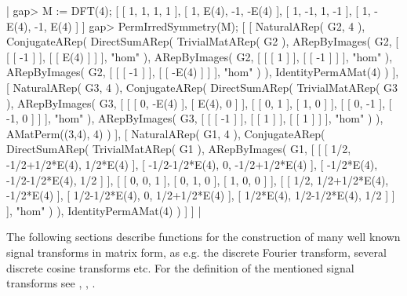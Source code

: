 |    gap> M := DFT(4);
    [ [ 1, 1, 1, 1 ], [ 1, E(4), -1, -E(4) ], [ 1, -1, 1, -1 ], 
      [ 1, -E(4), -1, E(4) ] ]
    gap> PermIrredSymmetry(M);
    [ [ NaturalARep( G2, 4 ), ConjugateARep(
              DirectSumARep(
                TrivialMatARep( G2 ),
                ARepByImages(
                  G2,
                  [ [ [ -1 ] ],
                    [ [ E(4) ] ]
                  ],
                  "hom"
                ),
                ARepByImages(
                  G2,
                  [ [ [ 1 ] ],
                    [ [ -1 ] ]
                  ],
                  "hom"
                ),
                ARepByImages(
                  G2,
                  [ [ [ -1 ] ],
                    [ [ -E(4) ] ]
                  ],
                  "hom"
                )
              ),
              IdentityPermAMat(4)
            ) ], [ NaturalARep( G3, 4 ), ConjugateARep(
              DirectSumARep(
                TrivialMatARep( G3 ),
                ARepByImages(
                  G3,
                  [ [ [ 0, -E(4) ], [ E(4), 0 ] ],
                    [ [ 0, 1 ], [ 1, 0 ] ],
                    [ [ 0, -1 ], [ -1, 0 ] ]
                  ],
                  "hom"
                ),
                ARepByImages(
                  G3,
                  [ [ [ -1 ] ],
                    [ [ 1 ] ],
                    [ [ 1 ] ]
                  ],
                  "hom"
                )
              ),
              AMatPerm((3,4), 4)
            ) ], [ NaturalARep( G1, 4 ), ConjugateARep(
              DirectSumARep(
                TrivialMatARep( G1 ),
                ARepByImages(
                  G1,
                  [ [ [ 1/2, -1/2+1/2*E(4), 1/2*E(4) ], 
              [ -1/2-1/2*E(4), 0, -1/2+1/2*E(4) ], 
              [ -1/2*E(4), -1/2-1/2*E(4), 1/2 ] ],
                    [ [ 0, 0, 1 ], [ 0, 1, 0 ], [ 1, 0, 0 ] ],
                    [ [ 1/2, 1/2+1/2*E(4), -1/2*E(4) ], 
              [ 1/2-1/2*E(4), 0, 1/2+1/2*E(4) ], 
              [ 1/2*E(4), 1/2-1/2*E(4), 1/2 ] ]
                  ],
                  "hom"
                )
              ),
              IdentityPermAMat(4)
            ) ] ] |


The following sections describe functions for the construction
of many well known signal transforms in matrix form, as e.g. 
the discrete Fourier transform, several discrete cosine transforms etc.
For the definition of the mentioned signal transforms 
see \cite{ER82}, \cite{Mal92}, \cite{Mer96}.

